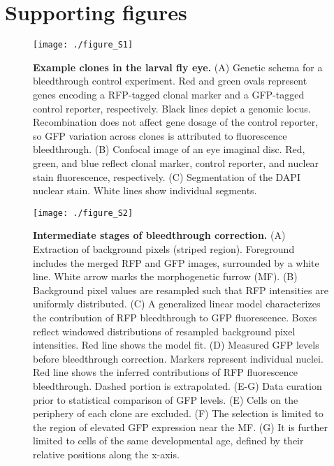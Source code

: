 \graphicspath{ {./figures/clones/} }


\section{Supporting figures}

\begin{figure}[h]
\texttt{[image: ./figure\_S1]}
\caption[Example clones in the larval fly eye.]{\textbf{Example clones in the larval fly eye.} (A) Genetic schema for a bleedthrough control experiment. Red and green ovals represent genes encoding a RFP-tagged clonal marker and a GFP-tagged control reporter, respectively. Black lines depict a genomic locus. Recombination does not affect gene dosage of the control reporter, so GFP variation across clones is attributed to fluorescence bleedthrough. (B) Confocal image of an eye imaginal disc. Red, green, and blue reflect clonal marker, control reporter, and nuclear stain fluorescence, respectively. (C) Segmentation of the DAPI nuclear stain. White lines show individual segments.}
\label{fig:clones:figS1}
\end{figure}

\begin{figure}[h]
\texttt{[image: ./figure\_S2]}
\caption[Intermediate stages of bleedthrough correction.]{\textbf{Intermediate stages of bleedthrough correction.} (A) Extraction of background pixels (striped region). Foreground includes the merged RFP and GFP images, surrounded by a white line. White arrow marks the morphogenetic furrow (MF). (B) Background pixel values are resampled such that RFP intensities are uniformly distributed. (C) A generalized linear model characterizes the contribution of RFP bleedthrough to GFP fluorescence. Boxes reflect windowed distributions of resampled background pixel intensities. Red line shows the model fit. (D) Measured GFP levels before bleedthrough correction. Markers represent individual nuclei. Red line shows the inferred contributions of RFP fluorescence bleedthrough. Dashed portion is extrapolated. (E-G) Data curation prior to statistical comparison of GFP levels. (E) Cells on the periphery of each clone are excluded. (F) The selection is limited to the region of elevated GFP expression near the MF. (G) It is further limited to cells of the same developmental age, defined by their relative positions along the x-axis.}
\label{fig:clones:figS2}
\end{figure}

